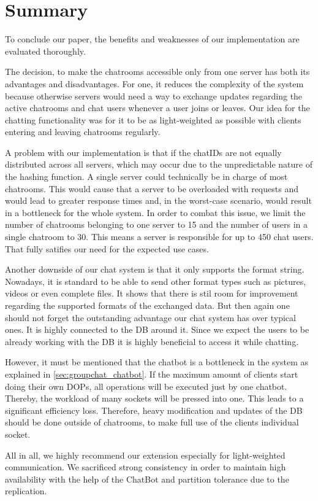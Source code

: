 \section{Summary}
\label{sec:summary}
To conclude our paper, the benefits and weaknesses of our implementation are evaluated thoroughly.

The decision, to make the chatrooms accessible only from one server has both its advantages and disadvantages. For one, it reduces the complexity of the system because otherwise servers would need a way to exchange updates regarding the active chatrooms and chat users whenever a user joins or leaves. Our idea for the chatting functionality was for it to be as light-weighted as possible with clients entering and leaving chatrooms regularly.

A problem with our implementation is that if the chatIDs are not equally distributed across all servers, which may occur due to the unpredictable nature of the hashing function. A single server could technically be in charge of most chatrooms. This would cause that a server to be overloaded with requests and would lead to greater response times and, in the worst-case scenario, would result in a bottleneck for the whole system. In order to combat this issue, we limit the number of chatrooms belonging to one server to 15 and the number of users in a single chatroom to 30. This means a server is responsible for up to 450 chat users. That fully satifies our need for the expected use cases.

Another downside of our chat system is that it only supports the format string. Nowadays, it is standard to be able to send other format types such as pictures, videos or even complete files. It shows that there is stil room for improvement regarding the supported formats of the exchanged data. But then again one should not forget the outstanding advantage our chat system has over typical ones. It is highly connected to the DB around it. Since we expect the users to be already working with the DB it is highly beneficial to access it while chatting.

However, it must be mentioned that the chatbot is a bottleneck in the system as explained in \ref{sec:groupchat_chatbot}. If the maximum amount of clients start doing their own DOPs, all operations will be executed just by one chatbot. Thereby, the workload of many sockets will be pressed into one. This leads to a significant efficiency loss. Therefore, heavy modification and updates of the DB should be done outside of chatrooms, to make full use of the clients individual socket.

All in all, we highly recommend our extension especially for light-weighted communication. We sacrificed strong consistency in order to maintain high availability with the help of the ChatBot and partition tolerance due to the replication.